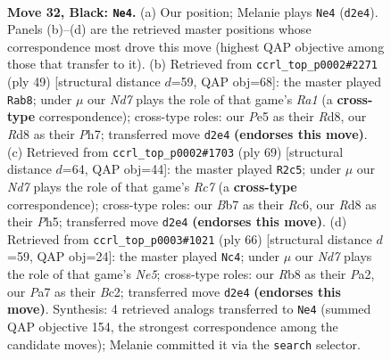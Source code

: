 \documentclass[11pt]{article}
\begin{document}
\clearpage

\begin{figure}[p]\centering
\begin{subfigure}{0.46\textwidth}\centering
\resizebox{\linewidth}{!}{%
\newchessgame
\chessboard[
  setfen={1r1r4/pb1p1pk1/8/2R1p3/6P1/8/PP1n1P2/2BK1BR1 b - - 2 32},
  showmover=false,
  pgfstyle=straightmove, color=movearrow, markmove={d2-e4}
]}
\caption{}
\end{subfigure}\hfill
\begin{subfigure}{0.46\textwidth}\centering
\resizebox{\linewidth}{!}{%
\newchessgame
\chessboard[
  setfen={r2r4/bB2kppp/p3p3/8/PP6/8/4nPPP/R1B1RK2 b - - 2 25},
  showmover=false,
  pgfstyle=straightmove, color=movearrow, markmove={a8-b8}
]}
\caption{}
\end{subfigure}
\\[4pt]
\begin{subfigure}{0.46\textwidth}\centering
\resizebox{\linewidth}{!}{%
\newchessgame
\chessboard[
  setfen={3R4/5pk1/2r5/1p5p/8/PP1Bp3/1Pr2bPP/1K1R4 b - - 7 35},
  showmover=false,
  pgfstyle=straightmove, color=movearrow, markmove={c2-c5}
]}
\caption{}
\end{subfigure}\hfill
\begin{subfigure}{0.46\textwidth}\centering
\resizebox{\linewidth}{!}{%
\newchessgame
\chessboard[
  setfen={1r1k4/1p6/3b1r2/2nPN2p/8/p7/P1B2P1P/3RR2K w - - 1 34},
  showmover=false,
  pgfstyle=straightmove, color=movearrow, markmove={e5-c4}
]}
\caption{}
\end{subfigure}
\caption{\textbf{Move 32, Black: \texttt{Ne4}.} (a) Our position; Melanie plays \texttt{Ne4} (\texttt{d2e4}). Panels (b)--(d) are the retrieved master positions whose correspondence most drove this move (highest QAP objective among those that transfer to it). (b) Retrieved from \texttt{ccrl\_top\_p0002\#2271} (ply 49) [structural distance $d$=59, QAP obj=68]: the master played \texttt{Rab8}; under $\mu$ our \emph{Nd7} plays the role of that game's \emph{Ra1} (a \textbf{cross-type} correspondence); cross-type roles: our \emph{P}e5 as their \emph{R}d8, our \emph{R}d8 as their \emph{P}h7; transferred move \texttt{d2e4} \textbf{(endorses this move)}. (c) Retrieved from \texttt{ccrl\_top\_p0002\#1703} (ply 69) [structural distance $d$=64, QAP obj=44]: the master played \texttt{R2c5}; under $\mu$ our \emph{Nd7} plays the role of that game's \emph{Rc7} (a \textbf{cross-type} correspondence); cross-type roles: our \emph{B}b7 as their \emph{R}c6, our \emph{R}d8 as their \emph{P}h5; transferred move \texttt{d2e4} \textbf{(endorses this move)}. (d) Retrieved from \texttt{ccrl\_top\_p0003\#1021} (ply 66) [structural distance $d$=59, QAP obj=24]: the master played \texttt{Nc4}; under $\mu$ our \emph{Nd7} plays the role of that game's \emph{Ne5}; cross-type roles: our \emph{R}b8 as their \emph{P}a2, our \emph{P}a7 as their \emph{B}c2; transferred move \texttt{d2e4} \textbf{(endorses this move)}. Synthesis: 4 retrieved analogs transferred to \texttt{Ne4} (summed QAP objective 154, the strongest correspondence among the candidate moves); Melanie committed it via the \texttt{search} selector.}
\label{fig:thought-m63}
\end{figure}
\end{document}
